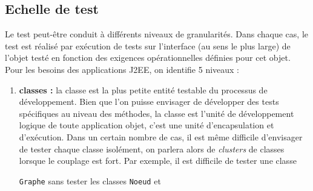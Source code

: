 \subsection{Echelle de test}
  
    Le test peut-\^etre conduit \`a diff\'erents niveaux de
    granularit\'es. Dans chaque cas, le test est r\'ealis\'e par ex\'ecution
    de tests sur l'interface (au sens le plus large) de l'objet test\'e en fonction des
    exigences op\'erationnelles d\'efinies pour cet objet. Pour les
    besoins des applications J2EE, on identifie 5 niveaux  :
    
\begin{enumerate}
       
\item 
\textbf{classes :}
   la classe est la plus petite entit\'e
     testable du processus de d\'eveloppement. Bien que l'on puisse
     envisager de d\'evelopper des tests sp\'ecifiques au niveau des
     m\'ethodes, la classe est l'unit\'e de d\'eveloppement logique de toute
     application objet, c'est une unit\'e d'encapsulation et
     d'ex\'ecution. Dans un certain nombre de cas, il est m\^eme difficile
     d'envisager de tester chaque classe isol\'ement, on parlera alors
     de 
\emph{clusters}
   de classes lorsque le couplage est
     fort. Par exemple, il est difficile de tester une classe
     
\texttt{Graphe}
   sans tester les classes 
\texttt{Noeud}
   et
     

\end{enumerate}
